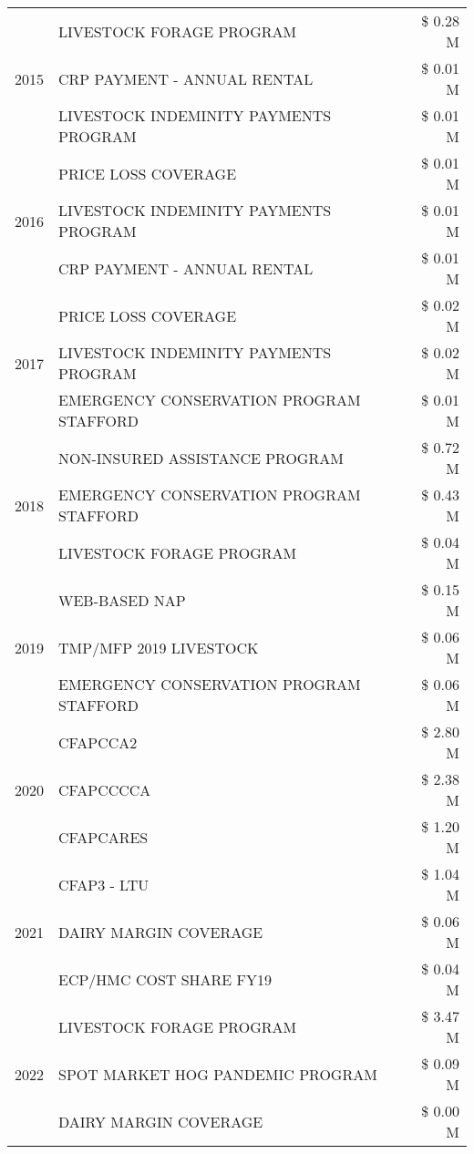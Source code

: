 \begin{tabular}{llr}
\cline{1-3}
\multirow[t]{3}{*}{2015} & LIVESTOCK FORAGE PROGRAM & \$ 0.28 M \\
 & CRP PAYMENT - ANNUAL RENTAL & \$ 0.01 M \\
 & LIVESTOCK INDEMINITY PAYMENTS PROGRAM & \$ 0.01 M \\
\cline{1-3}
\multirow[t]{3}{*}{2016} & PRICE LOSS COVERAGE & \$ 0.01 M \\
 & LIVESTOCK INDEMINITY PAYMENTS PROGRAM & \$ 0.01 M \\
 & CRP PAYMENT - ANNUAL RENTAL & \$ 0.01 M \\
\cline{1-3}
\multirow[t]{3}{*}{2017} & PRICE LOSS COVERAGE & \$ 0.02 M \\
 & LIVESTOCK INDEMINITY PAYMENTS PROGRAM & \$ 0.02 M \\
 & EMERGENCY CONSERVATION PROGRAM STAFFORD & \$ 0.01 M \\
\cline{1-3}
\multirow[t]{3}{*}{2018} & NON-INSURED ASSISTANCE PROGRAM & \$ 0.72 M \\
 & EMERGENCY CONSERVATION PROGRAM STAFFORD & \$ 0.43 M \\
 & LIVESTOCK FORAGE PROGRAM & \$ 0.04 M \\
\cline{1-3}
\multirow[t]{3}{*}{2019} & WEB-BASED NAP & \$ 0.15 M \\
 & TMP/MFP 2019 LIVESTOCK & \$ 0.06 M \\
 & EMERGENCY CONSERVATION PROGRAM STAFFORD & \$ 0.06 M \\
\cline{1-3}
\multirow[t]{3}{*}{2020} & CFAPCCA2 & \$ 2.80 M \\
 & CFAPCCCCA & \$ 2.38 M \\
 & CFAPCARES & \$ 1.20 M \\
\cline{1-3}
\multirow[t]{3}{*}{2021} & CFAP3 - LTU & \$ 1.04 M \\
 & DAIRY MARGIN COVERAGE & \$ 0.06 M \\
 & ECP/HMC COST SHARE FY19 & \$ 0.04 M \\
\cline{1-3}
\multirow[t]{3}{*}{2022} & LIVESTOCK FORAGE PROGRAM & \$ 3.47 M \\
 & SPOT MARKET HOG PANDEMIC PROGRAM & \$ 0.09 M \\
 & DAIRY MARGIN COVERAGE & \$ 0.00 M \\
\cline{1-3}
\bottomrule
\end{tabular}
